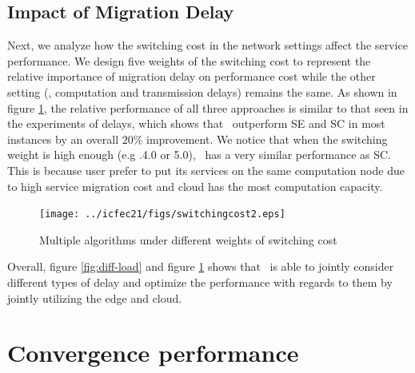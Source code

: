 \subsection{Impact of Migration Delay}
Next, we analyze how the switching cost in the network settings affect the service performance. We design five weights of the switching cost to represent the relative importance of migration delay on performance cost while the other setting (\ie, computation and transmission delays) remains the same. As shown in figure \ref{fig:switchweightbar}, the relative performance of all three approaches is similar to that seen in the experiments of delays, which shows that \myalgorithm\ outperform SE and SC in most instances by an overall $20\%$ improvement.
We notice that when the switching weight is high enough (e.g .4.0 or 5.0), \myalgorithm\ has a very similar performance as SC. This is because user prefer to put its services on the same computation node due to high service migration cost and cloud has the most computation capacity.
\begin{figure}
	\centering
	\texttt{[image: ../icfec21/figs/switchingcost2.eps]}
		\vspace{\baselineskip}
	\caption{Multiple algorithms under different weights of switching cost}
	\label{fig:switchweightbar}
\end{figure}



Overall, figure \ref{fig:diff-load} and  figure \ref{fig:switchweightbar} shows that \myalgorithm\ is able to jointly consider different types of delay and optimize the
performance with regards to them by jointly utilizing the edge and cloud.




\section{Convergence performance}
